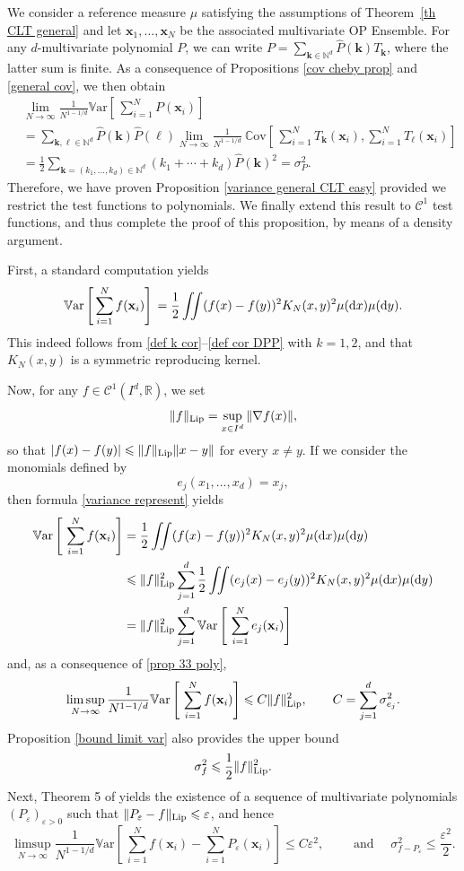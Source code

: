 \documentclass[a4paper,11pt]{article}
\numberwithin{equation}{section}
\theoremstyle{definition}
\newcommand{\eq}{\begin{equation}}
\newcommand{\qe}{\end{equation}}
\newcommand{\N}{\mathbb{N}}
\newcommand{\R}{\mathbb{R}}
\newcommand{\bs}{\boldsymbol}
\newcommand{\bv}{\mathbf}
\newcommand{\Var}{\mathbb{V}{\mathrm{ar}}}
\newcommand{\Cov}{\mathbb{C}{\mathrm{ov}}}
\renewcommand{\leq}{\leqslant}
\renewcommand{\epsilon}{\varepsilon}
\renewcommand{\d}{ {\rm d}}
\def\bx{{\bv x}}
\begin{document}
We consider a reference measure $\mu$ satisfying the assumptions of Theorem~\ref{th
  CLT general} and let $\bx_1,\dots,\bx_N$ be the associated multivariate OP Ensemble. For any $d$-multivariate polynomial $P$, we can write $P=\sum_{\bs k\in\N^d}
\hat P(\bs k) T_{\bs k}$, where the latter sum is finite. As a consequence of Propositions \ref{cov cheby prop} and \ref{general cov}, we then obtain
\begin{align}
\label{prop 33 poly}
&\lim_{N\to\infty} \frac{1}{N^{1-1/d}}\Var\left[\, \sum_{i=1}^{N}P(\bv x_i)\right]\nonumber \\
& = \sum_{\bs k,\bs \ell\in\N^d}\hat P(\bs k)\hat P(\bs \ell) \lim_{N\to\infty} \frac{1}{N^{1-1/d}}\ \Cov\left[\, \sum_{i=1}^{N}T_{\bs k}(\bv x_i),\sum_{i=1}^{N}T_{\bs \ell}(\bv x_i)\right]\nonumber\\
& = \frac12\sum_{\bs k=(k_1,\ldots,k_d)\in\N^d}(k_1+\cdots+k_d)\hat P(\bs k)^2=\sigma_P^2.
\end{align}
Therefore, we have proven Proposition \ref{variance general CLT easy} provided we restrict the test functions to polynomials. We finally extend this result to $\mathscr C^1$ test functions, and thus complete the proof of this proposition, by means of a density argument.

First, a standard computation yields
\eq
\label{variance represent}
\Var\left[\, \sum_{i=1}^{N}f(\bv x_i)\right]\\
= \frac{1}{2}\iint (f(x)-f(y))^2K_{N}(x,y)^2\mu(\d x)\mu(\d y).
\qe
This indeed follows from \eqref{def k cor}--\eqref{def cor DPP} with $k=1,2$,
and that $K_N(x,y)$ is a symmetric reproducing kernel.

Now, for any $f\in\mathscr C^1(I^d,\R)$, we set
\eq
\| f\|_{{\rm Lip}}=\sup_{x\in I^d}\|\nabla f(x) \|,
\qe
so that $|f(x)-f(y)|\leq \| f\|_{{\rm Lip}} \|x-y\|$ for every $x\neq y$. If we
consider the monomials defined by
\eq
\label{ej monom}
e_j(x_1,\ldots,x_d)=x_j,
\qe
then formula \eqref{variance represent} yields
\begin{align*}
\Var\left[\ \sum_{i=1}^N f(\bv x_i)\right] & = \frac12\iint (f(x)-f(y))^2K_N(x,y)^2\mu(\d x)\mu(\d y)\\
& \leq   \| f\|_{{\rm Lip}}^2\sum_{j=1}^d\frac{1}2\iint (e_j(x)-e_j(y))^2K_N(x,y)^2\mu(\d x)\mu(\d y)\\
& =   \| f\|_{{\rm Lip}}^2\sum_{j=1}^d\Var\left[\ \sum_{i=1}^N e_j(\bv x_i)\right]
\end{align*}
and, as a consequence of \eqref{prop 33 poly},
\eq
\limsup_{N\to\infty}\frac{1}{N^{1-1/d}}\Var\left[\ \sum_{i=1}^N f(\bv x_i)
\right]\leq C  \| f\|_{{\rm Lip}}^2,\qquad C=\sum_{j=1}^d \sigma_{e_j}^2.
\qe
Proposition \ref{bound limit var} also provides the upper bound
\eq
\sigma_f^2\leq  \frac1{2}\| f\|_{{\rm Lip}}^2.
\qe
Next, Theorem 5 of \cite{Pee09} yields the existence of a sequence of multivariate polynomials $(P_\epsilon)_{\epsilon>0}$ such that $\|P_\epsilon-f\|_{{\rm Lip}} \leq\epsilon$, and hence
\eq
\label{approx var P eps}
\limsup_{N\to\infty}\frac{1}{N^{1-1/d}}\Var\left[\ \sum_{i=1}^N f(\bv x_i)-\sum_{i=1}^N P_\epsilon(\bv x_i)
\right]\leq C\epsilon^2,\qquad \mbox{ and }\quad\sigma_{f-P_\epsilon}^2\leq \frac{\epsilon^2}{2}.
\qe
\end{document}

